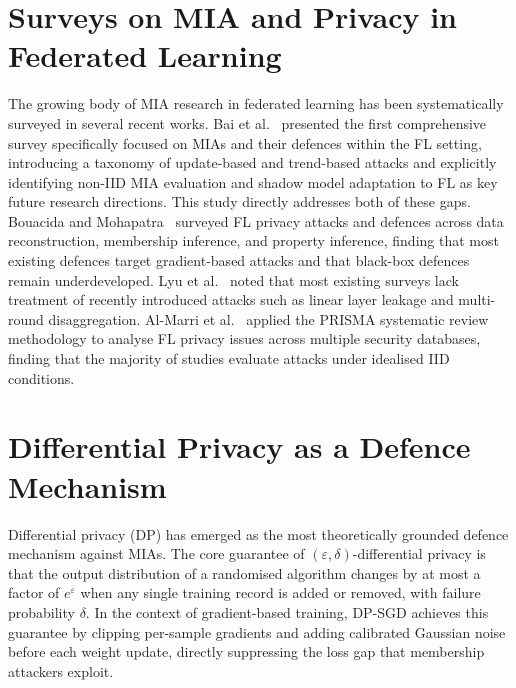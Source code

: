 \documentclass[12pt, a4paper]{report}
\begin{document}
\section{Surveys on MIA and Privacy in Federated Learning}

The growing body of MIA research in federated learning has been systematically
surveyed in several recent works. Bai et al.~\cite{bai2024survey} presented the
first comprehensive survey specifically focused on MIAs and their defences within
the FL setting, introducing a taxonomy of update-based and trend-based attacks
and explicitly identifying non-IID MIA evaluation and shadow model adaptation to
FL as key future research directions. This study directly addresses both of
these gaps. Bouacida and Mohapatra~\cite{bouacida2025} surveyed FL privacy attacks
and defences across data reconstruction, membership inference, and property
inference, finding that most existing defences target gradient-based attacks and
that black-box defences remain underdeveloped. Lyu et al.~\cite{lyu2024survey}
noted that most existing surveys lack treatment of recently introduced attacks
such as linear layer leakage and multi-round disaggregation. Al-Marri et
al.~\cite{almarri2024survey} applied the PRISMA systematic review methodology to
analyse FL privacy issues across multiple security databases, finding that the
majority of studies evaluate attacks under idealised IID conditions.

\section{Differential Privacy as a Defence Mechanism}

Differential privacy (DP) has emerged as the most theoretically grounded defence
mechanism against MIAs. The core guarantee of $(\varepsilon, \delta)$-differential
privacy is that the output distribution of a randomised algorithm changes by at
most a factor of $e^\varepsilon$ when any single training record is added or
removed, with failure probability $\delta$. In the context of gradient-based
training, DP-SGD achieves this guarantee by clipping per-sample gradients and
adding calibrated Gaussian noise before each weight update, directly suppressing
the loss gap that membership attackers exploit.
\end{document}
